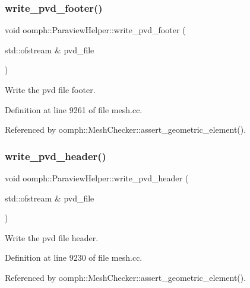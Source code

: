 \subsubsection{\texorpdfstring{write\+\_\+pvd\+\_\+footer()}{write\_pvd\_footer()}}
{\footnotesize\ttfamily void oomph\+::\+Paraview\+Helper\+::write\+\_\+pvd\+\_\+footer (\begin{DoxyParamCaption}\item[{std\+::ofstream \&}]{pvd\+\_\+file }\end{DoxyParamCaption})}



Write the pvd file footer. 



Definition at line 9261 of file mesh.\+cc.



Referenced by oomph\+::\+Mesh\+Checker\+::assert\+\_\+geometric\+\_\+element().

\mbox{\label{namespaceoomph_1_1ParaviewHelper_a5e200ee35119c91fb4ab83ddf5d55373}} 
\subsubsection{\texorpdfstring{write\+\_\+pvd\+\_\+header()}{write\_pvd\_header()}}
{\footnotesize\ttfamily void oomph\+::\+Paraview\+Helper\+::write\+\_\+pvd\+\_\+header (\begin{DoxyParamCaption}\item[{std\+::ofstream \&}]{pvd\+\_\+file }\end{DoxyParamCaption})}



Write the pvd file header. 



Definition at line 9230 of file mesh.\+cc.



Referenced by oomph\+::\+Mesh\+Checker\+::assert\+\_\+geometric\+\_\+element().

\mbox{\label{namespaceoomph_1_1ParaviewHelper_a970f03dfd06efb8efd2cfcc8d7a5c371}} 
